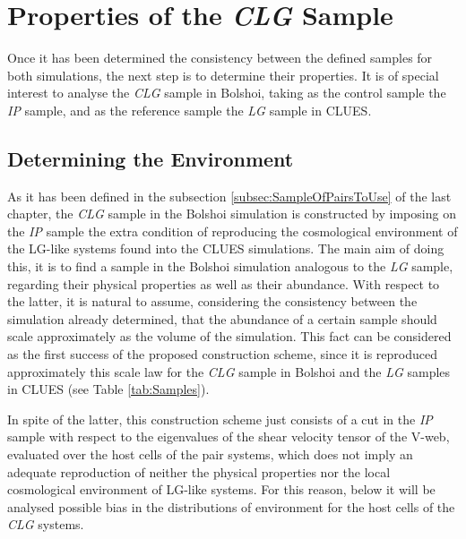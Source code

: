 



\section{Properties of the \textit{CLG} Sample}
\label{sec:PropertiesOfSamplePairs}


Once it has been determined the consistency between the defined samples 
for both simulations, the next step is to determine their properties. It 
is of special interest to analyse the \textit{CLG} sample in Bolshoi, 
taking as the control sample the \textit{IP} sample, and as the reference 
sample the \textit{LG} sample in CLUES.



	\subsection{Determining the Environment}
	\label{subsec:DeterminationOfTheirHostEnvironment}


As it has been defined in the subsection \ref{subsec:SampleOfPairsToUse} of
the last chapter, the \textit{CLG} sample in the Bolshoi simulation is 
constructed by imposing on the \textit{IP} sample the extra condition of 
reproducing the cosmological environment of the LG-like systems found into 
the CLUES simulations. The main aim of doing this, it is to find a sample 
in the Bolshoi simulation analogous to the \textit{LG} sample, regarding 
their physical properties as well as their abundance. With respect to the 
latter, it is natural to assume, considering the consistency between the 
simulation already determined, that the abundance of a certain sample 
should scale approximately as the volume of the simulation. This fact can
be considered as the first success of the proposed construction scheme, 
since it is reproduced approximately this scale law for the \textit{CLG} 
sample in Bolshoi and the \textit{LG} samples in CLUES (see Table 
\ref{tab:Samples}).


In spite of the latter, this construction scheme just consists of a cut
in the \textit{IP} sample with respect to the eigenvalues of the shear
velocity tensor of the V-web, evaluated over the host cells of the pair 
systems, which does not imply an adequate reproduction of neither the 
physical properties nor the local cosmological environment of LG-like
systems. For this reason, below it will be analysed possible bias in the 
distributions of environment for the host cells of the \textit{CLG} 
systems.


